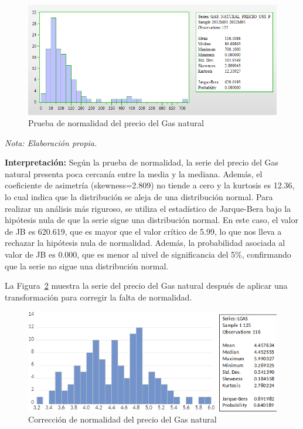 \documentclass[
  letterpaper,
  DIV=11,
  numbers=noendperiod]{scrartcl}
\begin{document}
\begin{figure}

\caption{\label{fig-7}Prueba de normalidad del precio del Gas natural}

{\centering \includegraphics{20230603091227.png}

}

\end{figure}

\emph{Nota: Elaboración propia.}

\textbf{Interpretación:} Según la prueba de normalidad, la serie del
precio del Gas natural presenta poca cercanía entre la media y la
mediana. Además, el coeficiente de asimetría (skewness=2.809) no tiende
a cero y la kurtosis es 12.36, lo cual indica que la distribución se
aleja de una distribución normal. Para realizar un análisis más
riguroso, se utiliza el estadístico de Jarque-Bera bajo la hipótesis
nula de que la serie sigue una distribución normal. En este caso, el
valor de JB es 620.619, que es mayor que el valor crítico de 5.99, lo
que nos lleva a rechazar la hipótesis nula de normalidad. Además, la
probabilidad asociada al valor de JB es 0.000, que es menor al nivel de
significancia del 5\%, confirmando que la serie no sigue una
distribución normal.

La Figura~\ref{fig-8} muestra la serie del precio del Gas natural
después de aplicar una transformación para corregir la falta de
normalidad.

\begin{figure}

\caption{\label{fig-8}Corrección de normalidad del precio del Gas
natural}

{\centering \includegraphics{20230603091315.png}

}

\end{figure}
\end{document}
